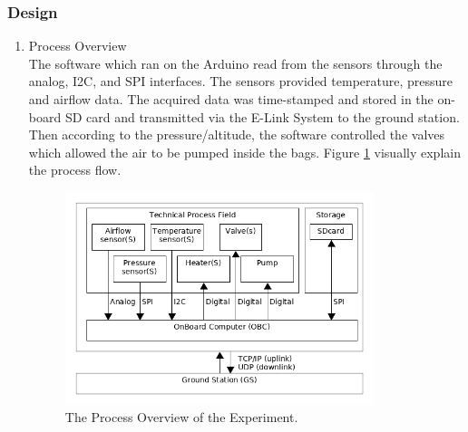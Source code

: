 \subsubsection{Design} \label{sec:4.8.2}
\begin{enumerate}[label=(\alph*)]
\item{Process Overview}\\
The software which ran on the Arduino read from the sensors through the analog, I2C, and SPI interfaces. The sensors provided temperature, pressure and airflow data. The acquired data was time-stamped and stored in the on-board SD card and transmitted via the E-Link System to the ground station. Then according to the pressure/altitude, the software controlled the valves which allowed the air to be pumped inside the bags. Figure \ref{processOverview} visually explain the process flow.

\begin{figure}[H]
    \centering
    \includegraphics[width=0.85\textwidth]{4-experiment-design/img/Process-overview-V0-3.png}
    \caption{The Process Overview of the Experiment.}
    \label{processOverview}
\end{figure}


\end{enumerate}
